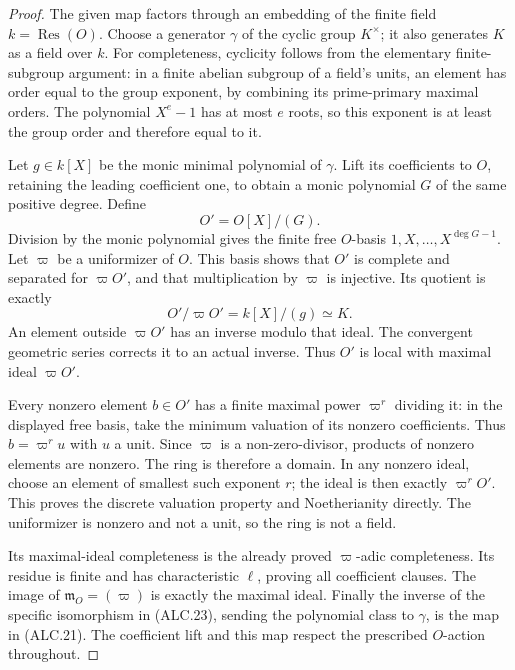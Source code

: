 \begin{proof}
The given map factors through an embedding of the finite
field \(k=\operatorname{Res}(O)\).  Choose a generator
\(\gamma\) of the cyclic group \(K^\times\); it also
generates \(K\) as a field over \(k\).  For completeness,
cyclicity follows from the elementary finite-subgroup argument:
in a finite abelian subgroup of a field's units, an element
has order equal to the group exponent, by combining its
prime-primary maximal orders.  The polynomial \(X^e-1\)
has at most \(e\) roots, so this exponent is at least the
group order and therefore equal to it.

Let \(g\in k[X]\) be the monic minimal polynomial of
\(\gamma\).  Lift its coefficients to \(O\), retaining
the leading coefficient one, to obtain a monic polynomial
\(G\) of the same positive degree.  Define
\[
                    O'=O[X]/(G).
                                                        \tag{ALC.22}
\]
Division by the monic polynomial gives the finite free
\(O\)-basis \(1,X,\ldots,X^{\deg G-1}\).  Let
\(\varpi\) be a uniformizer of \(O\).  This basis shows
that \(O'\) is complete and separated for \(\varpi O'\),
and that multiplication by \(\varpi\) is injective.  Its
quotient is exactly
\[
          O'/\varpi O'=k[X]/(g)\simeq K.
                                                        \tag{ALC.23}
\]
An element outside \(\varpi O'\) has an inverse modulo
that ideal.  The convergent geometric series corrects it
to an actual inverse.  Thus \(O'\) is local with maximal
ideal \(\varpi O'\).

Every nonzero element \(b\in O'\) has a finite maximal
power \(\varpi^r\) dividing it: in the displayed free
basis, take the minimum valuation of its nonzero
coefficients.  Thus \(b=\varpi^r u\) with \(u\) a
unit.  Since \(\varpi\) is a non-zero-divisor, products
of nonzero elements are nonzero.  The ring is therefore
a domain.  In any nonzero ideal, choose an element of
smallest such exponent \(r\); the ideal is then exactly
\(\varpi^rO'\).  This proves the discrete valuation
property and Noetherianity directly.  The uniformizer is
nonzero and not a unit, so the ring is not a field.

Its maximal-ideal completeness is the already proved
\(\varpi\)-adic completeness.  Its residue is finite and
has characteristic \(\ell\), proving all coefficient
clauses.  The image of \(\mathfrak m_O=(\varpi)\) is
exactly the maximal ideal.  Finally the inverse of the
specific isomorphism in (ALC.23), sending the polynomial
class to \(\gamma\), is the map in (ALC.21).  The
coefficient lift and this map respect the prescribed
\(O\)-action throughout.
\end{proof}

